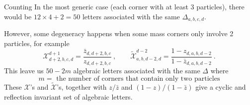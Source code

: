 \documentclass[10pt]{beamer}
\begin{document}
\begin{frame}{Counting}
  In the most generic case (each corner with at least 3 particles),
  there would be $12\times 4 +2 =50$ letters associated with the same $\Delta_{a,b,c,d}$. 

  However, some degeneracy happens when some mass corners only involve 2 particles, for example
  \[
    \mathcal{X}_{d+2,b,c,d}^{d+1}=\frac{\bar{z}_{d,d+2,b,c}}{z_{d,d+2,b,c}}\:,\qquad 
    \widetilde{\mathcal{X}}_{a,b,d-2,d}^{d-2}=\frac{1-z_{d,a,b,d-2}}{1-\bar{z}_{d,a,b,d-2}} \:.
  \]
  This leave us $50-2m$ algebraic letters associated with the same $\Delta$ where 
  \[
  m= \text{ the number of corners that contain only two particles}
  \]
  These $\mathcal{X}$'s and $\widetilde{\mathcal{X}}$'s, together with $z/\bar{z}$ and $(1-z)/(1-\bar{z})$ give a cyclic and reflection invariant set of algebraic letters. %
  
\end{frame}
\end{document}
